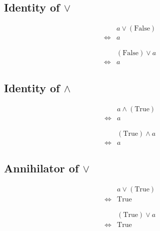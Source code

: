 \subsection{Identity of $\lor$}
\begin{prop}
\label{Proposition:lor_identity_1}
\begin{align*}
& a \lor (\text{False}) \\
\iff & a
\end{align*}
\end{prop}

\begin{prop}
\label{Proposition:lor_identity_2}
\begin{align*}
& (\text{False}) \lor a \\
\iff & a
\end{align*}
\end{prop}

\subsection{Identity of $\land$}
\begin{prop}
\label{Proposition:land_identity_1}
\begin{align*}
& a \land (\text{True}) \\
\iff & a
\end{align*}
\end{prop}

\begin{prop}
\label{Proposition:land_identity_2}
\begin{align*}
& (\text{True}) \land a \\
\iff & a
\end{align*}
\end{prop}

\subsection{Annihilator of $\lor$}
\begin{prop}
\label{Proposition:lor_annihilator_1}
\begin{align*}
& a \lor (\text{True}) \\
\iff & \text{True}
\end{align*}
\end{prop}

\begin{prop}
\label{Proposition:lor_annihilator_2}
\begin{align*}
& (\text{True}) \lor a \\
\iff & \text{True}
\end{align*}
\end{prop}

